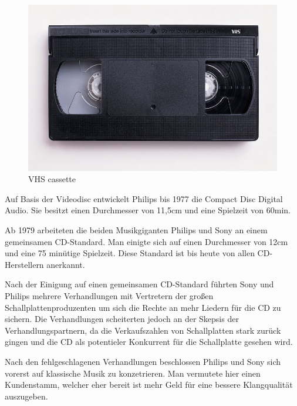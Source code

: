 \begin{figure}[h]
\begin{center}
\begin{minipage}[t]{0.3\textwidth}
\begin{center}
            \includegraphics[height=0.1\textheight]{Bilder/Optische_Datentraeger_Die_Compact_Disc/Geschichte/vhs.png}
            \caption[VHS cassette \newline \url{https://upload.wikimedia.org/wikipedia/commons/6/67/VHS-cassette.jpg}]{VHS cassette}
            \label{fig:vhs}
        \end{center}
      \end{minipage}
  \end{center}
\end{figure}

Auf Basis der Videodisc entwickelt Philips bis 1977 die Compact Disc Digital
Audio. Sie besitzt einen Durchmesser von 11,5cm und eine Spielzeit von 60min.

Ab 1979 arbeiteten die beiden Musikgiganten Philips und Sony an einem
gemeinsamen CD-Standard. Man einigte sich auf einen Durchmesser von 12cm und
eine 75 minütige Spielzeit. Diese Standard ist bis heute von allen
CD-Herstellern anerkannt. \cite{cds}

Nach der Einigung auf einen gemeinsamen CD-Standard führten Sony und Philips
mehrere Verhandlungen mit Vertretern der großen Schallplattenproduzenten um sich
die Rechte an mehr Liedern für die CD zu sichern. Die Verhandlungen scheiterten
jedoch an der Skepsis der Verhandlungspartnern, da die Verkaufszahlen von
Schallplatten stark zurück gingen und die CD als potentieler Konkurrent für die
Schallplatte gesehen wird.

Nach den fehlgeschlagenen Verhandlungen beschlossen Philips und Sony sich
vorerst auf klassische Musik zu konzetrieren. Man vermutete hier einen
Kundenstamm, welcher eher bereit ist mehr Geld für eine bessere Klangqualität
auszugeben.

